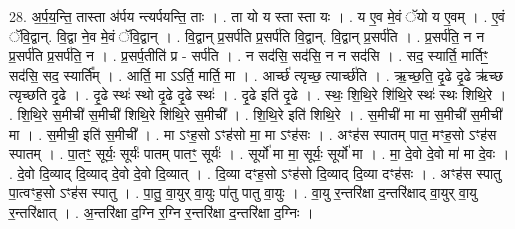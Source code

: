 \documentclass[17pt]{extarticle}
\begin{document}
28. अ॒र्प॒य॒न्ति॒ तास्ता अ॑र्पय न्त्यर्पयन्ति॒ ताः । . ता यो य स्ता स्ता यः । . य ए॒व मे॒वं ॅयो य ए॒वम् । . ए॒वं ॅवि॒द्वान्. वि॒द्वा ने॒व मे॒वं ॅवि॒द्वान् । . वि॒द्वान् प्र॒सर्प॑ति प्र॒सर्प॑ति वि॒द्वान्. वि॒द्वान् प्र॒सर्प॑ति । . प्र॒सर्प॑ति॒ न न प्र॒सर्प॑ति प्र॒सर्प॑ति॒ न । . प्र॒सर्प॒तीति॑ प्र - सर्प॑ति । . न सद॑सि॒ सद॑सि॒ न न सद॑सि । . सद॒ स्यार्ति॒ मार्तिꣳ॒॒ सद॑सि॒ सद॒ स्यार्ति᳚म् । . आर्ति॒ मा ऽऽर्ति॒ मार्ति॒ मा । . आर्च्छ॑ त्यृच्छ॒ त्यार्च्छ॑ति । . ऋ॒च्छ॒ति॒ दृ॒ढे दृ॒ढे ऋ॑च्छ त्यृच्छति दृ॒ढे । . दृ॒ढे स्थः॑ स्थो दृ॒ढे दृ॒ढे स्थः॑ । . दृ॒ढे इति॑ दृ॒ढे । . स्थः॒ शि॒थि॒रे शि॑थि॒रे स्थः॑ स्थः शिथि॒रे । . शि॒थि॒रे स॒मीची॑ स॒मीची॑ शिथि॒रे शि॑थि॒रे स॒मीची᳚ । . शि॒थि॒रे इति॑ शिथि॒रे । . स॒मीची॑ मा मा स॒मीची॑ स॒मीची॑ मा । . स॒मीची॒ इति॑ स॒मीची᳚ । . मा ऽꣳह॒सो ऽꣳह॑सो मा॒ मा ऽꣳह॑सः । . अꣳह॑स स्पातम् पात॒ मꣳह॒सो ऽꣳह॑स स्पातम् । . पा॒तꣳ॒॒ सूर्यः॒ सूर्यः॑ पातम् पातꣳ॒॒ सूर्यः॑ । . सूर्यो॑ मा मा॒ सूर्यः॒ सूर्यो॑ मा । . मा॒ दे॒वो दे॒वो मा॑ मा दे॒वः । . दे॒वो दि॒व्याद् दि॒व्याद् दे॒वो दे॒वो दि॒व्यात् । . दि॒व्या दꣳह॒सो ऽꣳह॑सो दि॒व्याद् दि॒व्या दꣳह॑सः । . अꣳह॑स स्पातु पा॒त्वꣳह॒सो ऽꣳह॑स स्पातु । . पा॒तु॒ वा॒युर् वा॒युः पा॑तु पातु वा॒युः । . वा॒यु र॒न्तरि॑क्षा द॒न्तरि॑क्षाद् वा॒युर् वा॒यु र॒न्तरि॑क्षात् । . अ॒न्तरि॑क्षा द॒ग्नि र॒ग्नि र॒न्तरि॑क्षा द॒न्तरि॑क्षा द॒ग्निः । \newline
\end{document}
